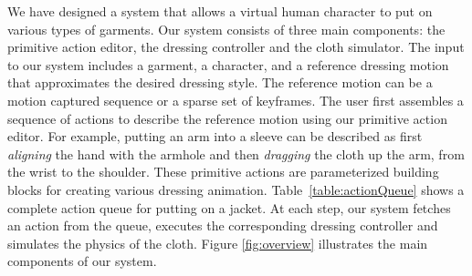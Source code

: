 We have designed a system that allows a virtual human character to put on
various types of garments. Our system consists of three main components:
the primitive action editor, the dressing controller and the cloth
simulator. The input to our system includes a garment, a character, and a
reference dressing motion that approximates the desired dressing style.
The reference motion can be a motion captured sequence or a sparse set of
keyframes. The user first assembles a sequence of actions to describe the
reference motion using our primitive action editor. For example, putting
an arm into a sleeve can be described as first \emph{aligning} the hand
with the armhole and then \emph{dragging} the cloth up the arm, from the
wrist to the shoulder. These primitive actions are parameterized
building blocks for creating various dressing animation.
Table~\ref{table:actionQueue} shows a complete action queue for putting on
a jacket. At each step, our system fetches an action from the
queue, executes the corresponding dressing controller and simulates the
physics of the cloth. Figure \ref{fig:overview} illustrates the main
components of our system. 


